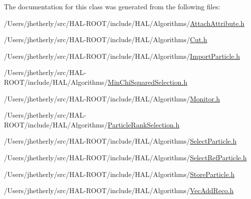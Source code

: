 The documentation for this class was generated from the following files\+:\begin{DoxyCompactItemize}
\item 
/\+Users/jhetherly/src/\+H\+A\+L-\/\+R\+O\+O\+T/include/\+H\+A\+L/\+Algorithms/\hyperlink{_attach_attribute_8h}{Attach\+Attribute.\+h}\item 
/\+Users/jhetherly/src/\+H\+A\+L-\/\+R\+O\+O\+T/include/\+H\+A\+L/\+Algorithms/\hyperlink{_cut_8h}{Cut.\+h}\item 
/\+Users/jhetherly/src/\+H\+A\+L-\/\+R\+O\+O\+T/include/\+H\+A\+L/\+Algorithms/\hyperlink{_import_particle_8h}{Import\+Particle.\+h}\item 
/\+Users/jhetherly/src/\+H\+A\+L-\/\+R\+O\+O\+T/include/\+H\+A\+L/\+Algorithms/\hyperlink{_min_chi_squared_selection_8h}{Min\+Chi\+Squared\+Selection.\+h}\item 
/\+Users/jhetherly/src/\+H\+A\+L-\/\+R\+O\+O\+T/include/\+H\+A\+L/\+Algorithms/\hyperlink{_monitor_8h}{Monitor.\+h}\item 
/\+Users/jhetherly/src/\+H\+A\+L-\/\+R\+O\+O\+T/include/\+H\+A\+L/\+Algorithms/\hyperlink{_particle_rank_selection_8h}{Particle\+Rank\+Selection.\+h}\item 
/\+Users/jhetherly/src/\+H\+A\+L-\/\+R\+O\+O\+T/include/\+H\+A\+L/\+Algorithms/\hyperlink{_select_particle_8h}{Select\+Particle.\+h}\item 
/\+Users/jhetherly/src/\+H\+A\+L-\/\+R\+O\+O\+T/include/\+H\+A\+L/\+Algorithms/\hyperlink{_select_ref_particle_8h}{Select\+Ref\+Particle.\+h}\item 
/\+Users/jhetherly/src/\+H\+A\+L-\/\+R\+O\+O\+T/include/\+H\+A\+L/\+Algorithms/\hyperlink{_store_particle_8h}{Store\+Particle.\+h}\item 
/\+Users/jhetherly/src/\+H\+A\+L-\/\+R\+O\+O\+T/include/\+H\+A\+L/\+Algorithms/\hyperlink{_vec_add_reco_8h}{Vec\+Add\+Reco.\+h}\end{DoxyCompactItemize}
